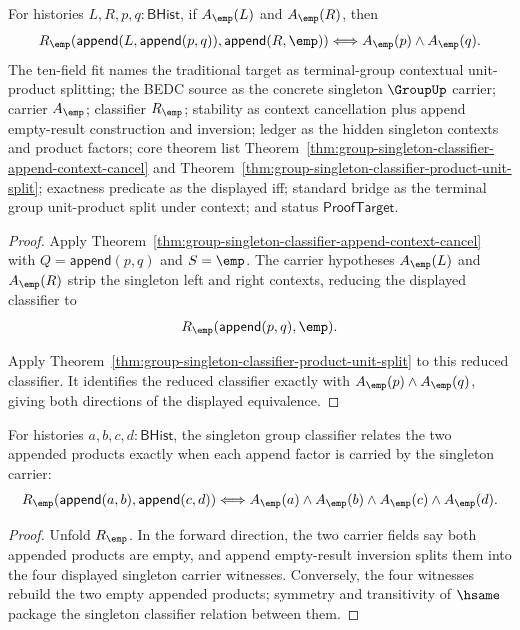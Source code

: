 \begin{theorem}
\label{thm:group-singleton-contextual-product-unit-split}
For histories $L,R,p,q:\mathsf{BHist}$, if $A_{\emp}(L)$ and $A_{\emp}(R)$,
then
$$
R_{\emp}(\mathsf{append}(L,\mathsf{append}(p,q)),\mathsf{append}(R,\emp))
\Longleftrightarrow
A_{\emp}(p)\land A_{\emp}(q).
$$
The ten-field fit names the traditional target as terminal-group contextual
unit-product splitting; the BEDC source as the concrete singleton $\GroupUp$
carrier; carrier $A_{\emp}$; classifier $R_{\emp}$; stability as context
cancellation plus append empty-result construction and inversion; ledger as the
hidden singleton contexts and product factors; core theorem list
Theorem~\ref{thm:group-singleton-classifier-append-context-cancel} and
Theorem~\ref{thm:group-singleton-classifier-product-unit-split}; exactness
predicate as the displayed iff; standard bridge as the terminal group
unit-product split under context; and status $\mathsf{ProofTarget}$.
\end{theorem}
\begin{proof}
Apply Theorem~\ref{thm:group-singleton-classifier-append-context-cancel} with
$Q=\mathsf{append}(p,q)$ and $S=\emp$. The carrier hypotheses $A_{\emp}(L)$ and
$A_{\emp}(R)$ strip the singleton left and right contexts, reducing the
displayed classifier to
$$
R_{\emp}(\mathsf{append}(p,q),\emp).
$$

Apply Theorem~\ref{thm:group-singleton-classifier-product-unit-split} to this
reduced classifier. It identifies the reduced classifier exactly with
$A_{\emp}(p)\land A_{\emp}(q)$, giving both directions of the displayed
equivalence.
\end{proof}

\begin{theorem}
\label{thm:group-singleton-classifier-append-product-empty-split}
For histories $a,b,c,d:\mathsf{BHist}$, the singleton group classifier relates
the two appended products exactly when each append factor is carried by the
singleton carrier:
$$
R_{\emp}(\mathsf{append}(a,b),\mathsf{append}(c,d))
\Longleftrightarrow
A_{\emp}(a)\land A_{\emp}(b)\land A_{\emp}(c)\land A_{\emp}(d).
$$
\end{theorem}
\begin{proof}
Unfold $R_{\emp}$. In the forward direction, the two carrier fields say both
appended products are empty, and append empty-result inversion splits them into
the four displayed singleton carrier witnesses. Conversely, the four witnesses
rebuild the two empty appended products; symmetry and transitivity of $\hsame$
package the singleton classifier relation between them.
\end{proof}

